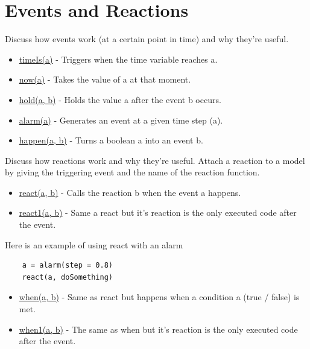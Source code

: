 \documentclass[10pt]{article}
\begin{document}
\section*{Events and Reactions}
Discuss how events work (at a certain point in time) and why they're useful.
\begin{itemize}
    \item \underline{timeIs(a)} - Triggers when the time variable reaches a.
    \item \underline{now(a)} - Takes the value of a at that moment.
    \item \underline{hold(a, b)} - Holds the value a after the event b occurs.
    \item \underline{alarm(a)} - Generates an event at a given time step (a).
    \item \underline{happen(a, b)} - Turns a boolean a into an event b.
\end{itemize}
Discuss how reactions work and why they're useful.
Attach a reaction to a model by giving the triggering event and the name of the reaction function.
\begin{itemize}
    \item \underline{react(a, b)} - Calls the reaction b when the event a happens.
    \item \underline{react1(a, b)} - Same a react but it's reaction is the only executed code after the event.
\end{itemize}
Here is an example of using react with an alarm
\begin{lstlisting}
    a = alarm(step = 0.8)
    react(a, doSomething)
\end{lstlisting}
\begin{itemize}
    \item \underline{when(a, b)} - Same as react but happens when a condition a (true / false) is met.
    \item \underline{when1(a, b)} - The same as when but it's reaction is the only executed code after the event.
\end{itemize}
\end{document}

